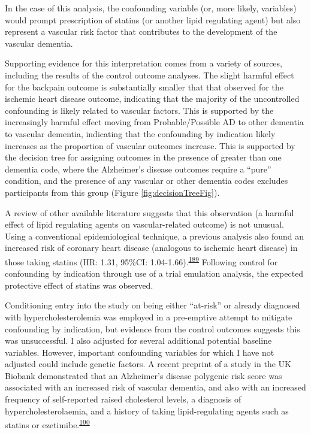 \documentclass[a4paper, twoside]{templates/ociamthesis}
\begin{document}
In the case of this analysis, the confounding variable (or, more likely, variables) would prompt prescription of statins (or another lipid regulating agent) but also represent a vascular risk factor that contributes to the development of the vascular dementia.

Supporting evidence for this interpretation comes from a variety of sources, including the results of the control outcome analyses. The slight harmful effect for the backpain outcome is substantially smaller that that observed for the ischemic heart disease outcome, indicating that the majority of the uncontrolled confounding is likely related to vascular factors. This is supported by the increasingly harmful effect moving from Probable/Possible AD to other dementia to vascular dementia, indicating that the confounding by indication likely increases as the proportion of vascular outcomes increase. This is supported by the decision tree for assigning outcomes in the presence of greater than one dementia code, where the Alzheimer's disease outcomes require a ``pure'' condition, and the presence of any vascular or other dementia codes excludes participants from this group (Figure \ref{fig:decisionTreeFig}).

A review of other available literature suggests that this observation (a harmful effect of lipid regulating agents on vascular-related outcome) is not unusual. Using a conventional epidemiological technique, a previous analysis also found an increased risk of coronary heart disease (analogous to ischemic heart disease) in those taking statins (HR: 1.31, 95\%CI: 1.04-1.66).\textsuperscript{\protect\hyperlink{ref-danaei2013b}{189}} Following control for confounding by indication through use of a trial emulation analysis, the expected protective effect of statins was observed.

Conditioning entry into the study on being either ``at-risk'' or already diagnosed with hypercholesterolemia was employed in a pre-emptive attempt to mitigate confounding by indication, but evidence from the control outcomes suggests this was unsuccessful. I also adjusted for several additional potential baseline variables. However, important confounding variables for which I have not adjusted could include genetic factors. A recent preprint of a study in the UK Biobank demonstrated that an Alzheimer's disease polygenic risk score was associated with an increased risk of vascular dementia, and also with an increased frequency of self-reported raised cholesterol levels, a diagnosis of hypercholesterolaemia, and a history of taking lipid-regulating agents such as statins or ezetimibe.\textsuperscript{\protect\hyperlink{ref-korologou-linden2020}{190}}
\end{document}
